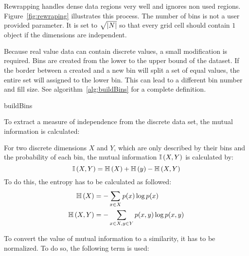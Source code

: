 Rewrapping handles dense data regions very well and ignores non used regions. Figure~\ref{fig:rewraping} illustrates this process. The number of bins is not a user provided parameter. It is set to $\sqrt{\left|N\right|}$ so that every grid cell should contain $1$ object if the dimensions are independent.

Because real value data can contain discrete values, a small modification is required. Bins are created from the lower to the upper bound of the dataset. If the border between a created and a new bin will split a set of equal values, the entire set will assigned to the lower bin. This can lead to a different bin number and fill size. See algorithm~\ref{alg:buildBins} for a complete definition.

\begin{algorithm}



	\caption{buildBins}
	\label{alg:buildBins}
\end{algorithm}

To extract a measure of independence from the discrete data set, the mutual information is calculated:

\begin{envdef}
	For two discrete dimensions $X$ and $Y$, which are only described by their bins and the probability of each bin, the mutual information $\mathbb{I}\left(X,Y\right)$ is calculated by:
	\begin{equation}
		\mathbb{I}\left(X,Y\right) = \mathbb{H}\left(X\right) + \mathbb{H}\left(y\right) - \mathbb{H}\left(X,Y\right)
	\end{equation}
	To do this, the entropy has to be calculated as followed:
	\begin{align}
		\mathbb{H}\left(X\right) &= - \sum_{x \in X} p(x) \log{p(x)}\\
		\mathbb{H}\left(X,Y\right) &= - \sum_{x \in X, y \in Y} p(x,y) \log{p(x,y)}
	\end{align}
\end{envdef}

To convert the value of mutual information to a similarity, it has to be normalized. To do so, the following term is used:

